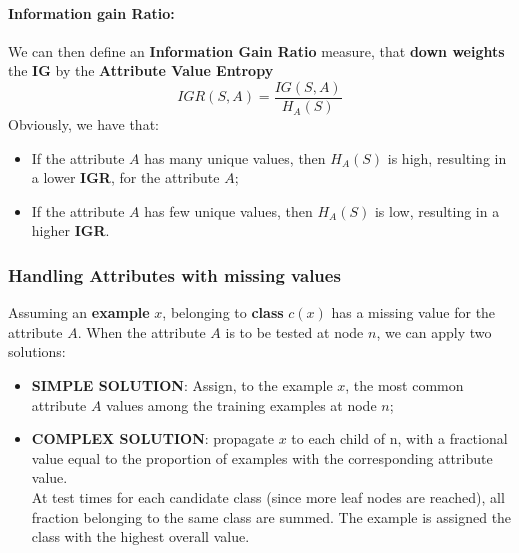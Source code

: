 \paragraph{Information gain Ratio:}
We can then define an \textbf{Information Gain Ratio} measure, that \textbf{down weights} the \textbf{IG} by the \textbf{Attribute Value Entropy}
\begin{equation}
    IGR(S, A) = \frac{IG(S,A)}{H_A(S)}
\end{equation}
Obviously, we have that:
\begin{itemize}
    \item If the attribute $A$ has many unique values, then $H_A(S)$ is high, resulting in a lower \textbf{IGR}, for the attribute $A$;
    \item If the attribute $A$ has few unique values, then $H_A(S)$ is low, resulting in a higher \textbf{IGR}.
\end{itemize}

\subsubsection{Handling Attributes with missing values}
Assuming an \textbf{example} $x$, belonging to \textbf{class} $c(x)$ has a missing value for the attribute $A$.
When the attribute $A$ is to be tested at node $n$, we can apply two solutions:
\begin{itemize}
    \item \textbf{SIMPLE SOLUTION}: Assign, to the example $x$, the most common attribute $A$ values among the training examples at node $n$;
    \item \textbf{COMPLEX SOLUTION}: propagate $x$ to each child of n, with a fractional value equal to the proportion of examples with the corresponding attribute value.
    \\At test times for each candidate class (since more leaf nodes are reached), all fraction belonging to the same class are summed. The example is assigned the class with the highest overall value.
\end{itemize}
